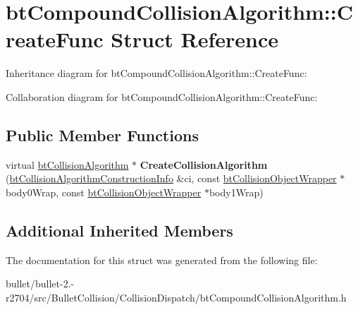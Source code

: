 \hypertarget{structbt_compound_collision_algorithm_1_1_create_func}{\section{bt\+Compound\+Collision\+Algorithm\+:\+:Create\+Func Struct Reference}
\label{structbt_compound_collision_algorithm_1_1_create_func}
}


Inheritance diagram for bt\+Compound\+Collision\+Algorithm\+:\+:Create\+Func\+:


Collaboration diagram for bt\+Compound\+Collision\+Algorithm\+:\+:Create\+Func\+:
\subsection*{Public Member Functions}
\begin{DoxyCompactItemize}
\item 
\hypertarget{structbt_compound_collision_algorithm_1_1_create_func_ace3507575919730b70f4f8d392cd1369}{virtual \hyperlink{classbt_collision_algorithm}{bt\+Collision\+Algorithm} $\ast$ {\bfseries Create\+Collision\+Algorithm} (\hyperlink{structbt_collision_algorithm_construction_info}{bt\+Collision\+Algorithm\+Construction\+Info} \&ci, const \hyperlink{structbt_collision_object_wrapper}{bt\+Collision\+Object\+Wrapper} $\ast$body0\+Wrap, const \hyperlink{structbt_collision_object_wrapper}{bt\+Collision\+Object\+Wrapper} $\ast$body1\+Wrap)}\label{structbt_compound_collision_algorithm_1_1_create_func_ace3507575919730b70f4f8d392cd1369}

\end{DoxyCompactItemize}
\subsection*{Additional Inherited Members}


The documentation for this struct was generated from the following file\+:\begin{DoxyCompactItemize}
\item 
bullet/bullet-\/2.-\/r2704/src/\+Bullet\+Collision/\+Collision\+Dispatch/bt\+Compound\+Collision\+Algorithm.\+h\end{DoxyCompactItemize}

